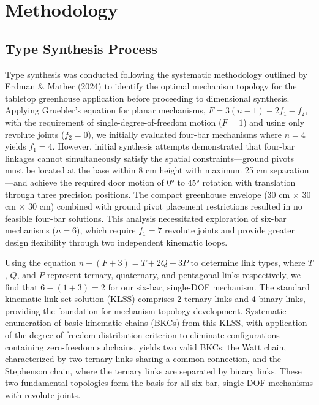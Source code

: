 \documentclass[12pt]{article}
\begin{document}
\section{Methodology}
\label{sec:methodology}

\subsection{Type Synthesis Process}
\label{sec:type_synthesis}

Type synthesis was conducted following the systematic methodology outlined by Erdman \& Mather (2024) to identify the optimal mechanism topology for the tabletop greenhouse application before proceeding to dimensional synthesis. Applying Gruebler's equation for planar mechanisms, $F = 3(n-1) - 2f_1 - f_2$, with the requirement of single-degree-of-freedom motion ($F=1$) and using only revolute joints ($f_2=0$), we initially evaluated four-bar mechanisms where $n=4$ yields $f_1=4$. However, initial synthesis attempts demonstrated that four-bar linkages cannot simultaneously satisfy the spatial constraints—ground pivots must be located at the base within 8 cm height with maximum 25 cm separation—and achieve the required door motion of 0° to 45° rotation with translation through three precision positions. The compact greenhouse envelope (30 cm × 30 cm × 30 cm) combined with ground pivot placement restrictions resulted in no feasible four-bar solutions. This analysis necessitated exploration of six-bar mechanisms ($n=6$), which require $f_1=7$ revolute joints and provide greater design flexibility through two independent kinematic loops.

Using the equation $n-(F+3)=T+2Q+3P$ to determine link types, where $T$, $Q$, and $P$ represent ternary, quaternary, and pentagonal links respectively, we find that $6-(1+3)=2$ for our six-bar, single-DOF mechanism. The standard kinematic link set solution (KLSS) comprises 2 ternary links and 4 binary links, providing the foundation for mechanism topology development. Systematic enumeration of basic kinematic chains (BKCs) from this KLSS, with application of the degree-of-freedom distribution criterion to eliminate configurations containing zero-freedom subchains, yields two valid BKCs: the Watt chain, characterized by two ternary links sharing a common connection, and the Stephenson chain, where the ternary links are separated by binary links. These two fundamental topologies form the basis for all six-bar, single-DOF mechanisms with revolute joints.
\end{document}
